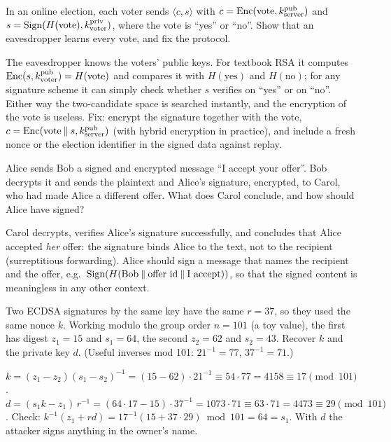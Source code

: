\begin{exercise}
In an online election, each voter sends $\langle c, s \rangle$ with $c = \operatorname{Enc}(\text{vote}, k_{\mathrm{server}}^{\mathrm{pub}})$ and $s = \operatorname{Sign}(H(\text{vote}), k_{\mathrm{voter}}^{\mathrm{priv}})$, where the vote is \enquote{yes} or \enquote{no}. Show that an eavesdropper learns every vote, and fix the protocol.
\end{exercise}
\begin{solution}
The eavesdropper knows the voters' public keys. For textbook RSA it computes $\operatorname{Enc}(s, k_{\mathrm{voter}}^{\mathrm{pub}}) = H(\text{vote})$ and compares it with $H(\text{yes})$ and $H(\text{no})$; for any signature scheme it can simply check whether $s$ verifies on \enquote{yes} or on \enquote{no}. Either way the two-candidate space is searched instantly, and the encryption of the vote is useless. Fix: encrypt the signature together with the vote, $c = \operatorname{Enc}(\text{vote} \mathbin{\|} s, k_{\mathrm{server}}^{\mathrm{pub}})$ (with hybrid encryption in practice), and include a fresh nonce or the election identifier in the signed data against replay.
\end{solution}

\begin{exercise}
Alice sends Bob a signed and encrypted message \enquote{I accept your offer}. Bob decrypts it and sends the plaintext and Alice's signature, encrypted, to Carol, who had made Alice a different offer. What does Carol conclude, and how should Alice have signed?
\end{exercise}
\begin{solution}
Carol decrypts, verifies Alice's signature successfully, and concludes that Alice accepted \emph{her} offer: the signature binds Alice to the text, not to the recipient (surreptitious forwarding). Alice should sign a message that names the recipient and the offer, e.g.\ $\operatorname{Sign}(H(\text{Bob} \mathbin{\|} \text{offer id} \mathbin{\|} \text{I accept}))$, so that the signed content is meaningless in any other context.
\end{solution}

\begin{exercise}
Two ECDSA signatures by the same key have the same $r = 37$, so they used the same nonce $k$. Working modulo the group order $n = 101$ (a toy value), the first has digest $z_1 = 15$ and $s_1 = 64$, the second $z_2 = 62$ and $s_2 = 43$. Recover $k$ and the private key $d$. (Useful inverses mod 101: $21^{-1} = 77$, $37^{-1} = 71$.)
\end{exercise}
\begin{solution}
$k = (z_1 - z_2)(s_1 - s_2)^{-1} = (15 - 62) \cdot 21^{-1} \equiv 54 \cdot 77 = 4158 \equiv 17 \pmod{101}$.
$d = (s_1 k - z_1)\, r^{-1} = (64 \cdot 17 - 15) \cdot 37^{-1} = 1073 \cdot 71 \equiv 63 \cdot 71 = 4473 \equiv 29 \pmod{101}$.
Check: $k^{-1}(z_1 + r d) = 17^{-1}(15 + 37 \cdot 29) \bmod 101 = 64 = s_1$. With $d$ the attacker signs anything in the owner's name.
\end{solution}

